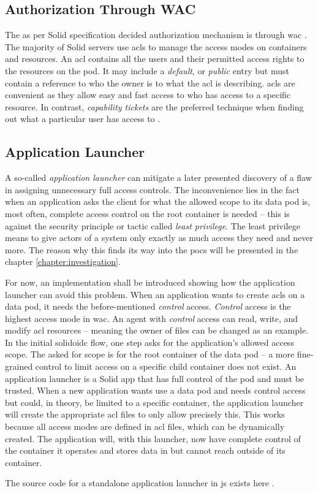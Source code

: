 \subsection{Authorization Through WAC}

The as per Solid specification decided authorization mechanism is through \gls{wac} \cite{wac}. The majority of Solid servers use \glspl{acl} to manage the access modes on containers and resources. An \gls{acl} contains all the users and their permitted access rights to the resources on the pod. It may include a \textit{default}, or \textit{public} entry but must contain a reference to who the owner is to what the \gls{acl} is describing. \glspl{acl} are convenient as they allow easy and fast access to who has access to a specific resource. In contrast, \textit{capability tickets} are the preferred technique when finding out what a particular user has access to \cite{stallings}.

\subsection{Application Launcher}

A so-called \textit{application launcher} can mitigate a later presented discovery of a flaw in assigning unnecessary full access controls. The inconvenience lies in the fact when an application asks the client for what the allowed scope to its data pod is, most often, complete access control on the root container is needed -- this is against the security principle or tactic called \textit{least privilege}. The least privilege means to give actors of a system only exactly as much access they need and never more. The reason why this finds its way into the \glspl{poc} will be presented in the chapter \ref{chapter:investigation}.

For now, an implementation shall be introduced showing how the application launcher can avoid this problem. When an application wants to create \glspl{acl} on a data pod, it needs the before-mentioned \textit{control} access. \textit{Control} access is the highest access mode in \gls{wac}. An agent with \textit{control} access can read, write, and modify \gls{acl} resources -- meaning the owner of files can be changed as an example.
In the initial \gls{solidoidc} flow, one step asks for the application's allowed access scope. The asked for scope is for the root container of the data pod -- a more fine-grained control to limit access on a specific child container does not exist. An application launcher is a Solid app that has full control of the pod and must be trusted. When a new application wants use a data pod and needs control access but could, in theory, be limited to a specific container, the application launcher will create the appropriate \gls{acl} files to only allow precisely this.
This works because all access modes are defined in \gls{acl} files, which can be dynamically created. The application will, with this launcher, now have complete control of the container it operates and stores data in but cannot reach outside of its container.

The source code for a standalone application launcher in \gls{js} exists here \cite{app-launcher}.
